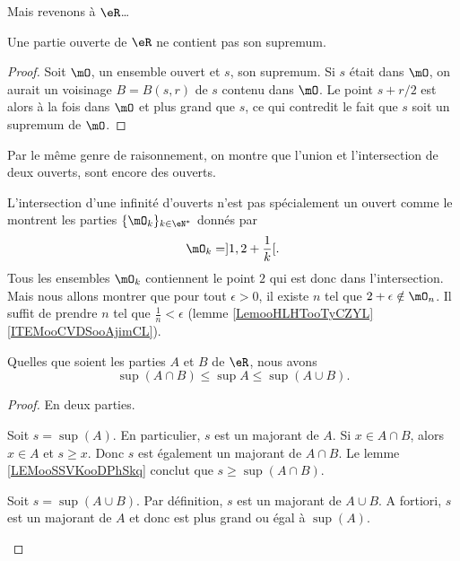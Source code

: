 Mais revenons à \( \eR \)\dots
\begin{lemma}  \label{LemSupOuvPas}
	Une partie ouverte de \( \eR\) ne contient pas son supremum.
\end{lemma}

\begin{proof}
	Soit \( \mO\), un ensemble ouvert et \( s\), son supremum. Si \( s\) était dans \( \mO\), on aurait un voisinage \( B=B(s,r)\) de \( s\) contenu dans \( \mO\). Le point \( s+r/2\) est alors à la fois dans \( \mO\) et plus grand que \( s\), ce qui contredit le fait que \( s\) soit un supremum de \( \mO\).
\end{proof}

Par le même genre de raisonnement, on montre que l'union et l'intersection de deux ouverts, sont encore des ouverts.

\begin{remark}
	L'intersection d'une infinité d'ouverts n'est pas spécialement un ouvert comme le montrent les parties \( \{ \mO_k \}_{k\in \eN^*}\) donnés par
	\begin{equation}
		\mO_k=]1,2+\frac{ 1 }{ k }[.
	\end{equation}
	Tous les ensembles \( \mO_k\) contiennent le point \( 2\) qui est donc dans l'intersection. Mais nous allons montrer que pour tout \( \epsilon>0\), il existe \( n\) tel que \( 2+\epsilon\notin\mO_n\). Il suffit de prendre \( n\) tel que \( \frac{1}{ n }<\epsilon\) (lemme \ref{LemooHLHTooTyCZYL}\ref{ITEMooCVDSooAjimCL}).
\end{remark}

\begin{proposition}     \label{PROPooANIOooIJHelX}
	Quelles que soient les parties \( A\) et \( B\) de \( \eR\), nous avons
	\begin{equation}
		\sup(A\cap B)\leq\sup A\leq\sup(A\cup B).
	\end{equation}
\end{proposition}

\begin{proof}
	En deux parties.
	\begin{subproof}
		Soit \( s=\sup(A)\). En particulier, \( s\) est un majorant de \( A\). Si \( x\in A\cap B\), alors \( x\in A\) et \( s\geq x\). Donc \( s\) est également un majorant de \( A\cap B\). Le lemme \ref{LEMooSSVKooDPhSkq} conclut que \( s\geq \sup(A\cap B)\).

		Soit \( s=\sup(A\cup B)\). Par définition, \( s\) est un majorant de \( A\cup B\). A fortiori, \( s\) est un majorant de \( A\) et donc est plus grand ou égal à \( \sup(A)\).
	\end{subproof}
\end{proof}

